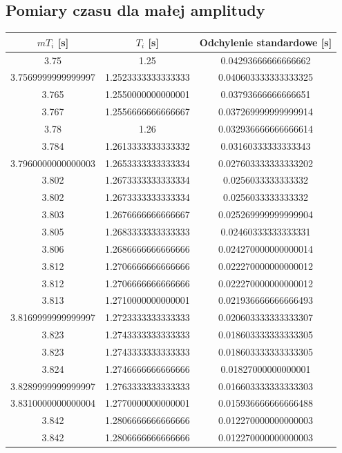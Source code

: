 \documentclass[a4paper,12pt]{article}
\begin{document}
\begin{justify}
\subsection{Pomiary czasu dla małej amplitudy}

\begin{scriptsize}
\begin{longtable}{|c|c|c|}
\hline
$mT_{i}$ [s] & $T_{i}$ [s] & Odchylenie standardowe [s] \\
\hline
3.75 & 1.25 & 0.04293666666666662 \\
3.7569999999999997 & 1.2523333333333333 & 0.040603333333333325 \\
3.765 & 1.2550000000000001 & 0.03793666666666651 \\
3.767 & 1.2556666666666667 & 0.037269999999999914 \\
3.78 & 1.26 & 0.032936666666666614 \\
3.784 & 1.2613333333333332 & 0.03160333333333343 \\
3.7960000000000003 & 1.2653333333333334 & 0.027603333333333202 \\
3.802 & 1.2673333333333334 & 0.0256033333333332 \\
3.802 & 1.2673333333333334 & 0.0256033333333332 \\
3.803 & 1.2676666666666667 & 0.025269999999999904 \\
3.805 & 1.2683333333333333 & 0.02460333333333331 \\
3.806 & 1.2686666666666666 & 0.024270000000000014 \\
3.812 & 1.2706666666666666 & 0.022270000000000012 \\
3.812 & 1.2706666666666666 & 0.022270000000000012 \\
3.813 & 1.2710000000000001 & 0.021936666666666493 \\
3.8169999999999997 & 1.2723333333333333 & 0.020603333333333307 \\
3.823 & 1.2743333333333333 & 0.018603333333333305 \\
3.823 & 1.2743333333333333 & 0.018603333333333305 \\
3.824 & 1.2746666666666666 & 0.01827000000000001 \\
3.8289999999999997 & 1.2763333333333333 & 0.016603333333333303 \\
3.8310000000000004 & 1.2770000000000001 & 0.015936666666666488 \\
3.842 & 1.2806666666666666 & 0.012270000000000003 \\
3.842 & 1.2806666666666666 & 0.012270000000000003 \\

\end{longtable}
\end{scriptsize}
\end{justify}
\end{document}
